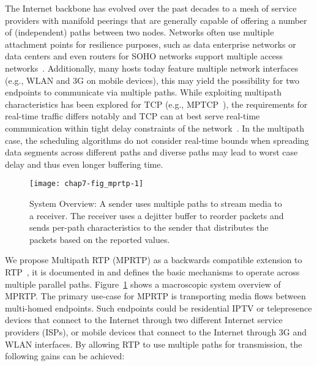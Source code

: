 The Internet backbone has evolved over the past decades to a mesh of service
providers with manifold peerings that are generally capable of offering a
number of (independent) paths between two nodes. Networks often use multiple
attachment points for resilience purposes, such as data enterprise networks or
data centers and even routers for SOHO networks support multiple access
networks~\cite{draft.fun.multi, draft.homenet.arch}. Additionally, many hosts
today feature multiple network interfaces (e.g., WLAN and 3G on mobile
devices), this may yield the possibility for two endpoints to communicate via
multiple paths. While exploiting multipath characteristics
\cite{Wischik:2008:RPP} has been explored for TCP (e.g.,
MPTCP~\cite{rfc6824}), the requirements for real-time traffic differs notably
and TCP can at best serve real-time communication within tight delay
constraints of the network~\cite{Brosh:tcp-real-time}. In the multipath case,
the scheduling algorithms do not consider real-time bounds when spreading data
segments across different paths and diverse paths may lead to worst case delay
and thus even longer buffering time.

\begin{figure}
\centerline {
\texttt{[image: chap7-fig\_mprtp-1]}
}
\caption{System Overview: A sender uses multiple paths to stream media
  to a receiver.  The receiver uses a dejitter buffer to reorder
  packets and sends per-path characteristics to the sender that
  distributes the packets based on the reported values.}
\label{chap7:fig_mprtp}
\end{figure}

We propose Multipath RTP (MPRTP) as a backwards compatible extension to
RTP~\cite{rfc3550}, it is documented in \cite{draft.mprtp} and defines the
basic mechanisms to operate across multiple parallel paths.
Figure~\ref{chap7:fig_mprtp} shows a macroscopic system overview of MPRTP. The
primary use-case for MPRTP is transporting media flows between multi-homed
endpoints. Such endpoints could be residential IPTV or telepresence devices
that connect to the Internet through two different Internet service providers
(ISPs), or mobile devices that connect to the Internet through 3G and WLAN
interfaces. By allowing RTP to use multiple paths for transmission, the
following gains can be achieved:

